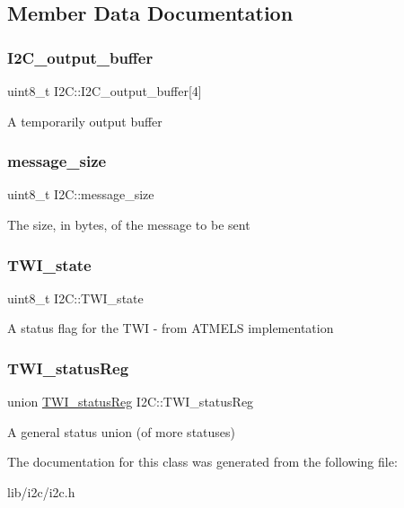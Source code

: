 \subsection{Member Data Documentation}
\hypertarget{class_i2_c_a4de289c8a3651d7b6aaca518844bb3f1}{}\label{class_i2_c_a4de289c8a3651d7b6aaca518844bb3f1} 
\subsubsection{\texorpdfstring{I2\+C\+\_\+output\+\_\+buffer}{I2C\_output\_buffer}}
{\footnotesize\ttfamily uint8\+\_\+t I2\+C\+::\+I2\+C\+\_\+output\+\_\+buffer\mbox{[}4\mbox{]}}

A temporarily output buffer \hypertarget{class_i2_c_a88add0edd8c518054944a8188ab11d0c}{}\label{class_i2_c_a88add0edd8c518054944a8188ab11d0c} 
\subsubsection{\texorpdfstring{message\+\_\+size}{message\_size}}
{\footnotesize\ttfamily uint8\+\_\+t I2\+C\+::message\+\_\+size}

The size, in bytes, of the message to be sent \hypertarget{class_i2_c_aeb2f95017c3d3440a3fc27a20994fac7}{}\label{class_i2_c_aeb2f95017c3d3440a3fc27a20994fac7} 
\subsubsection{\texorpdfstring{T\+W\+I\+\_\+state}{TWI\_state}}
{\footnotesize\ttfamily uint8\+\_\+t I2\+C\+::\+T\+W\+I\+\_\+state}

A status flag for the T\+WI -\/ from A\+T\+M\+E\+LS implementation \hypertarget{class_i2_c_a07cc6b21ede25e6b3ef1e9b3131108e6}{}\label{class_i2_c_a07cc6b21ede25e6b3ef1e9b3131108e6} 
\subsubsection{\texorpdfstring{T\+W\+I\+\_\+status\+Reg}{TWI\_statusReg}}
{\footnotesize\ttfamily union \hyperlink{union_t_w_i__status_reg}{T\+W\+I\+\_\+status\+Reg} I2\+C\+::\+T\+W\+I\+\_\+status\+Reg}

A general status union (of more statuses) 

The documentation for this class was generated from the following file\+:\begin{DoxyCompactItemize}
\item 
lib/i2c/i2c.\+h\end{DoxyCompactItemize}
